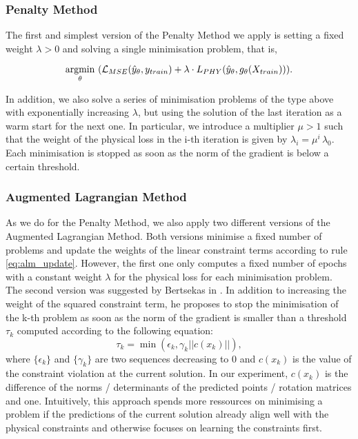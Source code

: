 \subsubsection{Penalty Method}
The first and simplest version of the Penalty Method we apply is setting a fixed weight $\lambda > 0$ and solving a single minimisation problem, that is,

\[\underset{\theta}{\operatorname*{argmin}} \,\, (\mathcal{L}_{MSE}(\hat{y}_\theta, y_{train}) + \lambda \cdot L_{PHY}(\hat{y}_\theta, g_\theta(X_{train}))).\]

In addition, we also solve a series of minimisation problems of the type above with exponentially increasing $\lambda$, but using the solution of the last iteration as a warm start for the next one. In particular, we introduce a multiplier $\mu > 1$ such that the weight of the physical loss in the i-th iteration is given by $\lambda_i = \mu^i \, \lambda_0$. Each minimisation is stopped as soon as the norm of the gradient is below a certain threshold.

\subsubsection{Augmented Lagrangian Method}
\label{exp:alm}
As we do for the Penalty Method, we also apply two different versions of the Augmented Lagrangian Method. Both versions minimise a fixed number of problems and update the weights of the linear constraint terms according to rule \ref{eq:alm_update}. However, the first one only computes a fixed number of epochs with a constant weight $\lambda$ for the physical loss for each minimisation problem.\\
\indent The second version was suggested by Bertsekas in \cite{Yurkiewicz1985ConstrainedOA}. In addition to increasing the weight of the squared constraint term, he proposes to stop the minimisation of the k-th problem as soon as the norm of the gradient is smaller than a threshold $\tau_k$ computed according to the following equation:
\[\tau_k = \min(\epsilon_k, \gamma_k ||c(x_k)||), \]
where $\{\epsilon_k\}$ and $\{\gamma_k \}$ are two sequences decreasing to 0 and $c(x_k)$ is the value of the constraint violation at the current solution. In our experiment, $c(x_k)$ is the difference of the norms / determinants of the predicted points / rotation matrices and one. Intuitively, this approach spends more ressources on minimising a problem if the predictions of the current solution already align well with the physical constraints and otherwise focuses on learning the constraints first.

